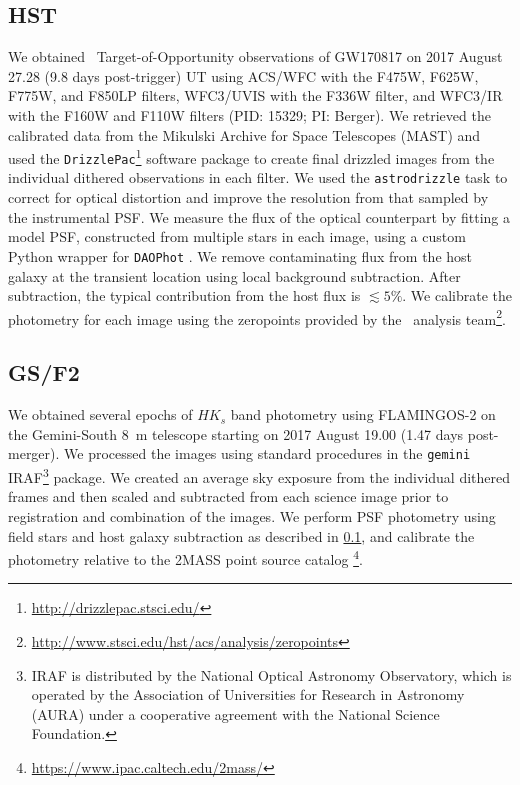 \subsection{HST}
\label{sec:ch5_data_HST}
We obtained \HST\ Target-of-Opportunity observations of GW170817 on 2017 August 27.28 (9.8 days post-trigger) UT using ACS/WFC with the F475W, F625W, F775W, and F850LP filters, WFC3/UVIS with the F336W filter, and WFC3/IR with the F160W and F110W filters (PID: 15329; PI: Berger).  We retrieved the calibrated data from the Mikulski Archive for Space Telescopes (MAST) and used the {\tt DrizzlePac}\footnote{\singlespace \url{http://drizzlepac.stsci.edu/}} software package to create final drizzled images from the individual dithered observations in each filter.  We used the {\tt astrodrizzle} task to correct for optical distortion and improve the resolution from that sampled by the instrumental PSF. We measure the flux of the optical counterpart by fitting a model PSF, constructed from multiple stars in each image, using a custom Python wrapper for {\tt DAOPhot} \citep{Stetson1987}. We remove contaminating flux from the host galaxy at the transient location using local background subtraction. After subtraction, the typical contribution from the host flux is $\lesssim5\%$. We calibrate the photometry for each image using the zeropoints provided by the \HST\ analysis team\footnote{\singlespace \url{http://www.stsci.edu/hst/acs/analysis/zeropoints}}.

\subsection{GS/F2}
\label{sec:ch5_data_GSF2}
We obtained several epochs of $HK_s$ band photometry using FLAMINGOS-2 on the Gemini-South 8~m telescope \citep{Eikenberry+12} starting on 2017 August 19.00 (1.47 days post-merger). We processed the images using standard procedures in the {\tt gemini} IRAF\footnote{\singlespace IRAF is distributed by the National Optical Astronomy Observatory, which is operated by the Association of Universities for Research in Astronomy (AURA) under a cooperative agreement with the National Science Foundation.} package.  We created an average sky exposure from the individual dithered frames and then scaled and subtracted from each science image prior to registration and combination of the images. We perform PSF photometry using field stars and host galaxy subtraction as described in \cref{sec:ch5_data_HST}, and calibrate the photometry relative to the 2MASS point source catalog \footnote{\singlespace \url{https://www.ipac.caltech.edu/2mass/}}.

